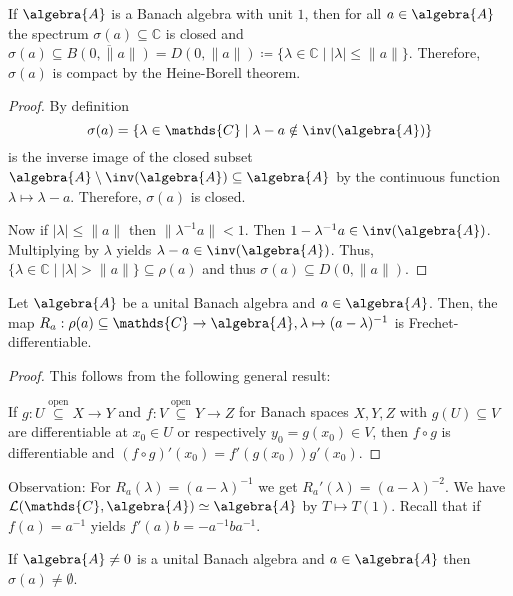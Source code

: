 \documentclass[a4paper]{article}
\begin{document}
\begin{theorem}
	If $\algebra{A}$ is a Banach algebra with unit $1$, then for all $a \in \algebra{A}$ the spectrum $\sigma(a) \subseteq \mathds{C}$ is closed and $\sigma(a) \subseteq \overline{B(0, \| a \|)} = D(0, \|a\|) \coloneq \{\lambda \in \mathds{C} \mid |\lambda| \leq \|a\| \} $. Therefore, $\sigma(a)$ is compact by the Heine-Borell theorem.
\end{theorem}

\begin{proof}
	By definition
	\begin{equation*}
		\sigma(a) = \{ \lambda \in \mathds{C} \mid \lambda - a \notin \inv(\algebra{A}) \}
	\end{equation*}
	is the inverse image of the closed subset $\algebra{A} \setminus \inv(\algebra{A}) \subseteq \algebra{A}$ by the continuous function $\lambda \mapsto \lambda - a$.
	Therefore, $\sigma(a)$ is closed.

	Now if $|\lambda| \leq \|a\|$ then $\|\lambda^{-1} a\| < 1$.
	Then $1 - \lambda^{-1} a \in \inv(\algebra{A})$.
	Multiplying by $\lambda$ yields $\lambda - a \in \inv(\algebra{A})$.
	Thus, $\{\lambda \in \mathds{C} \mid |\lambda| > \|a\|\} \subseteq \rho(a)$ and thus $\sigma(a) \subseteq D(0, \|a\|)$.
\end{proof}

\begin{lemma}
	Let $\algebra{A}$ be a unital Banach algebra and $a \in \algebra{A}$.
	Then, the map $R_a: \rho(a) \subseteq \mathds{C} \to \algebra{A}, \lambda \mapsto (a - \lambda)^{-1}$ is Frechet-differentiable.
\end{lemma}

\begin{proof}
	This follows from the following general result:

	If $g: U \overset{\text{open}}{\subseteq} X \to Y$ and $f: V \overset{\text{open}}{\subseteq} Y \to Z$ for Banach spaces $X,Y,Z$ with $g(U) \subseteq V$ are differentiable at $x_0 \in U$ or respectively $y_0 = g(x_0) \in V$, then $f \circ g$ is differentiable and $(f \circ g)' (x_0) = f'(g(x_0)) g'(x_0)$.
\end{proof}

Observation: For $R_a(\lambda) = (a - \lambda)^{-1}$ we get $R_a'(\lambda) = (a - \lambda)^{-2}$.
We have $\mathcal{L}(\mathds{C}, \algebra{A}) \simeq \algebra{A}$ by $T \mapsto T(1)$.
Recall that if $f(a) = a^{-1}$ yields $f'(a) b = - a^{-1} b a^{-1}$.

\begin{theorem}[Gelfand]
	If $\algebra{A} \neq 0$ is a unital Banach algebra and $a \in \algebra{A}$ then $\sigma(a) \neq \emptyset$.
\end{theorem}
\end{document}

